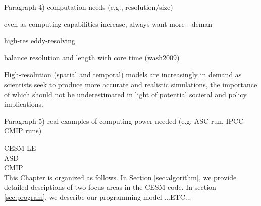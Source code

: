 




{\color{red}Paragraph 4) computation needs (e.g., resolution/size)}

even as computing capabilities increase, always want more - deman

high-res
eddy-resolving

balance resolution and length with core time (wash2009)

High-resolution (spatial and temporal) models are increasingly in demand as scientists seek to produce more accurate and realistic simulations, the importance of which should not be underestimated in light of potential societal and policy implications.  


{\color{red} Paragraph 5) real examples of computing power needed (e.g. ASC run, IPCC CMIP runs)}

CESM-LE \cite{kay2015}\\
ASD \cite{small2014}\\
CMIP\\

This Chapter is organized as follows. In Section \ref{sec:algorithm}, we provide detailed desciptions of two focus areas in the CESM code. In section \ref{sec:program},  we describe our programming model ...{\color{red}ETC...}
